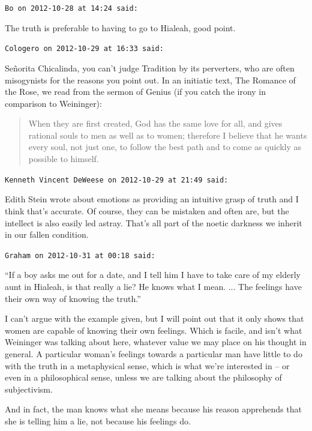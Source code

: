 \begin{footnotesize}
\begin{sffamily}
\texttt{Bo on 2012-10-28 at 14:24 said:}

The truth is preferable to having to go to Hialeah, good point.

\hfill

\texttt{Cologero on 2012-10-29 at 16:33 said:}

Señorita Chicalinda, you can't judge Tradition by its perverters, who are often misogynists for the reasons you point out. In an initiatic text, The Romance of the Rose, we read from the sermon of Genius (if you catch the irony in comparison to Weininger):

\begin{quote}\footnotesize

When they are first created, God has the same love for all, and gives rational souls to men as well as to women; therefore I believe that he wants every soul, not just one, to follow the best path and to come as quickly as possible to himself.
\end{quote}


\hfill

\texttt{Kenneth Vincent DeWeese on 2012-10-29 at 21:49 said:}

Edith Stein wrote about emotions as providing an intuitive grasp of truth and I think that's accurate. Of course, they can be mistaken and often are, but the intellect is also easily led astray. That's all part of the noetic darkness we inherit in our fallen condition.

\hfill

\texttt{Graham on 2012-10-31 at 00:18 said:}

``If a boy asks me out for a date, and I tell him I have to take care of my elderly aunt in Hialeah, is that really a lie? He knows what I mean. ... The feelings have their own way of knowing the truth.''

I can't argue with the example given, but I will point out that it only shows that women are capable of knowing their own feelings. Which is facile, and isn't what Weininger was talking about here, whatever value we may place on his thought in general. A particular woman's feelings towards a particular man have little to do with the truth in a metaphysical sense, which is what we're interested in -- or even in a philosophical sense, unless we are talking about the philosophy of subjectivism.

And in fact, the man knows what she means because his reason apprehends that she is telling him a lie, not because his feelings do.


\end{sffamily}
\end{footnotesize}
